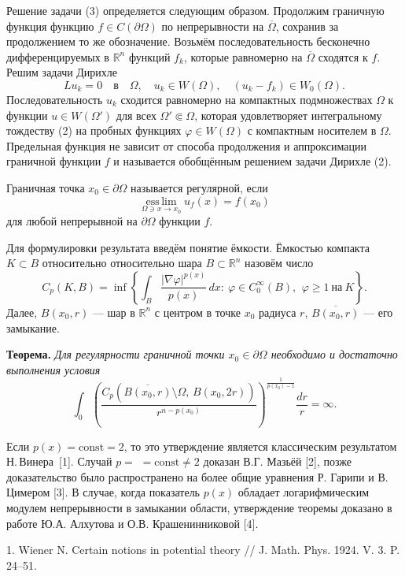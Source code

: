 Решение задачи (3) определяется следующим образом. Продолжим граничную функция функцию $f\in C(\partial \Omega)$ по непрерывности на $\overline{\Omega}$, сохранив за продолжением то же обозначение. Возьмём последовательность бесконечно дифференцируемых в $\mathbb{R}^n$ функций $f_k$, которые равномерно на $\overline{\Omega}$ сходятся к $f$. Решим задачи Дирихле
$$
Lu_k=0 \quad\text{в}\quad \Omega, \quad u_k \in W(\Omega), \quad (u_k-f_k)\in W_0(\Omega).
$$
Последовательность $u_k$ сходится равномерно  на компактных подмножествах $\Omega$ к функции $u\in W(\Omega')$ для всех $\Omega'\Subset \Omega$, которая удовлетворяет интегральному тождеству (2) на пробных функциях $\varphi \in W(\Omega)$ с компактным носителем в $\Omega$. Предельная функция не зависит от способа продолжения и аппроксимации граничной функции $f$ и называется обобщённым решением задачи Дирихле (2).

Граничная точка $x_0\in \partial \Omega$ называется регулярной, если
$$
\mathop{\mathrm{ess\,lim}}\limits_{\Omega \ni x\to x_0} u_f(x)= f(x_0)
$$
для любой непрерывной на $\partial \Omega$ функции $f$.

Для формулировки результата введём понятие ёмкости. Ёмкостью компакта $K\subset B$ относительно относительно шара $B\subset \mathbb{R}^n$ назовём число
$$
C_p (K, B)=\inf \left\{ \int_B \frac{|\nabla \varphi|^{p(x)}}{p(x)}\,dx:\ \varphi\in C_0^\infty(B),\ \,\varphi\geqslant 1\ \text{на}\ K \right\}.
$$
Далее, $B(x_0,r)$ --- шар в $\mathbb{R}^n$ с центром в точке $x_0$ радиуса $r$, $\overline{B(x_0,r)}$ --- его замыкание.

{\bf Теорема.} {\it Для регулярности граничной точки $x_0\in \partial \Omega$ необходимо и достаточно выполнения условия
$$
\int_0 \left( \frac{C_p \left(\overline{B(x_0,r)}\setminus \Omega,\, B(x_0,2r) \right)}{r^{n-p(x_0)}} \right)^\frac{1}{p(x_0)-1}\frac{dr}{r}=\infty.
$$
}

Если $p(x)=\mathrm{const}=2$, то это утверждение является классическим результатом Н.\,Винера~[1].
Случай
$p=$
\linebreak
$= \mathrm{const}\neq2$ доказан В.Г. Мазьёй [2], позже доказательство было распространено на более общие уравнения Р. Гарипи и В. Цимером [3]. В случае, когда показатель $p(x)$ обладает логарифмическим модулем непрерывности в замыкании области, утверждение теоремы  доказано в работе Ю.А. Алхутова и О.В. Крашенинниковой [4].

\litlist

1. Wiener N. Certain notions in potential theory // J. Math. Phys. 1924. V. 3. P. 24--51.

